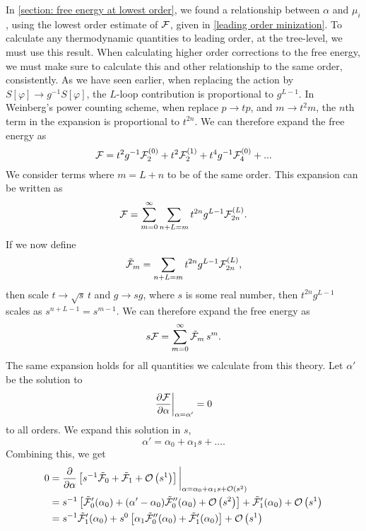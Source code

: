 In \autoref{section: free energy at lowest order}, we found a relationship between $\alpha$ and $\mu_i$, using the lowest order estimate of $\mathcal{F}$, given in \cref{leading order minization}.
To calculate any thermodynamic quantities to leading order, at the tree-level, we must use this result.
When calculating higher order corrections to the free energy, we must make sure to calculate this and other relationship to the same order, consistently.
As we have seen earlier, when replacing the action by $S[\varphi] \rightarrow g^{-1}S[\varphi]$, the $L$-loop contribution is proportional to $g^{L-1}$.
In Weinberg's power counting scheme, when replace $p \rightarrow t p$, and $m \rightarrow t^2 m$, the $n$th term in the expansion is proportional to $t^{2n}$.
We can therefore expand the free energy as
\begin{equation}
    \mathcal{F} = t^2 g^{-1} \mathcal{F}_2^{(0)} + t^2 \mathcal{F}_2^{(1)} + t^4 g^{-1} \mathcal{F}_4^{(0)}
    + ...
\end{equation}
We consider terms where $m = L + n$ to be of the same order.
This expansion can be written as
\begin{equation}
    \mathcal{F} = \sum_{m=0}^\infty \sum_{n+L=m} t^{2n} g^{L-1} \mathcal{F}_{2n}^{(L)}.
\end{equation}
If we now define
\begin{equation}
    \tilde {\mathcal{F}}_m = \sum_{n+L=m} t^{2n} g^{L-1} \mathcal{F}_{2n}^{(L)},
\end{equation}
then scale $t \rightarrow \sqrt{s} \, t$ and $g \rightarrow s g$, where $s$ is some real number, then $t^{2n}g^{L-1}$ scales as $s^{n+L-1} = s^{m-1}$.
We can therefore expand the free energy as
\begin{equation}
    s \mathcal{F} = \sum_{m= 0}^\infty \tilde {\mathcal{F}}_m \, s^{m}.
\end{equation}
The same expansion holds for all quantities we calculate from this theory.
Let $\alpha'$ be the solution to
\begin{equation}
    \diffp{\Ef}{\alpha} \bigg|_{\alpha=\alpha'} = 0
\end{equation}
to all orders.
We expand this solution in $s$,
\begin{equation}
    \alpha' = \alpha_0 + \alpha_1 s + \dots.
\end{equation}
Combining this, we get
\begin{align*}
    0 &
    = 
    \diffp{}{\alpha}
    \left[
        s^{-1}\tilde \Ef_0
        + 
        \tilde \Ef_1
        +
        \Oh[1]{s}
    \right]
    \bigg|_{\alpha=\alpha_0 + \alpha_1 s + \Oh{s}} 
    \\
    & = 
    s^{-1 }
    \left[
        \tilde \Ef_0'(\alpha_0)
        +
        (\alpha' - \alpha_0)
        \tilde \Ef_0''(\alpha_0)
        +
        \Oh[2]{s}
    \right]
    +
    \tilde\Ef_1'(\alpha_0)
    +
    \Oh[1]{s} \\
    &
    =
    s^{-1} \tilde\Ef_1'(\alpha_0)
    + s^{0}
    \left[
        \alpha_1
        \tilde \Ef_0''(\alpha_0)
        +
    \tilde\Ef_1'(\alpha_0)
    \right]
    +
    \Oh[1]{s}
\end{align*}
